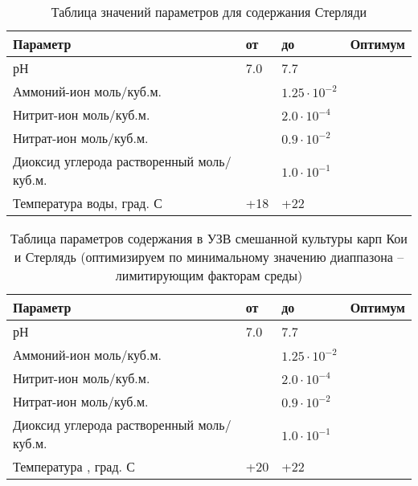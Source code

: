    \begin{table}[H]
        \caption{Таблица значений параметров для содержания Стерляди}
        \begin{tabular}{|l|l|l|l|}
        \hline
        Параметр &	от &	до &	Оптимум \\
        \hline
        рН &	7.0 &	7.7	& \\
        \hline
        Аммоний-ион моль/куб.м.	&   & $1.25 \cdot 10^{-2}$  & \\
        \hline
        Нитрит-ион моль/куб.м. &	&	$2.0 \cdot 10^{-4}$ &	\\
        \hline
        Нитрат-ион моль/куб.м. &	&  $0.9 \cdot 10^{-2}$  & \\
        \hline	
        Диоксид углерода 
        растворенный  моль/куб.м. &    & $1.0 \cdot 10^{-1}$	&\\ 
        \hline
        Температура  воды, град. С	&  +18 & +22	&\\
        \hline
        \end{tabular}
    \end{table}
\begin{table}[H]
    \caption{Таблица параметров содержания в УЗВ смешанной культуры карп Кои и Стерлядь 
    (оптимизируем по минимальному значению диаппазона – лимитирующим факторам среды)}
    \begin{tabular}{|l|l|l|l|}
        \hline
        Параметр &	от &	до &	Оптимум \\
        \hline
        рН	& 7.0 &	7.7	& \\
        \hline
        Аммоний-ион моль/куб.м.	&  &	$1.25 \cdot 10^{-2}$	& \\
        \hline
        Нитрит-ион моль/куб.м. &  &	   $ 2.0 \cdot 10^{-4}$	& \\
        \hline
        Нитрат-ион моль/куб.м. &  & $0.9 \cdot 10^{-2}$ & \\
        \hline	
        Диоксид углерода 
        растворенный   моль/куб.м. &  &	$1.0 \cdot 10^{-1}$	& \\
        \hline
        Температура , град. С &	+20	 & +22 &	\\  
        \hline
    \end{tabular}
\end{table}